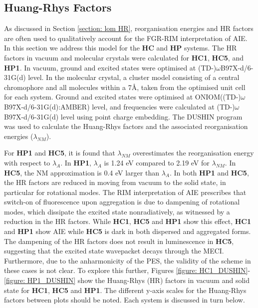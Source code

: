 \subsection{Huang-Rhys Factors}\label{section: HR}
As discussed in Section \ref{section: lom HR}, reorganisation energies and \acf{HR} factors are often used to qualitatively account for the \ac{FGR-RIM} interpretation of \ac{AIE}. In this section we address this model for the \textbf{HC} and \textbf{HP} systems.  The \ac{HR} factors in vacuum and molecular crystals were calculated for \textbf{HC1}, \textbf{HC5}, and \textbf{HP1}. In vacuum, ground and excited states were optimised at (TD-)$\omega$B97X-d/6-31G(d) level. In the molecular crystal, a cluster model consisting of a central chromophore and all molecules within a 7\AA{}, taken from the optimised unit cell for each system. Ground and excited states were optimised at ONIOM((TD-)$\omega$B97X-d/6-31G(d):AMBER) level, and frequencies were calculated at (TD-)$\omega$B97X-d/6-31G(d) level using point charge embedding. The DUSHIN program was used to calculate the Huang-Rhys factors and the associated reorganisation energies ($\lambda_{NM}$).\cite{Reimers2001}

For \textbf{HP1} and \textbf{HC5}, it is found that $\lambda_{NM}$ overestimates the reorganisation energy with respect to $\lambda_{A}$. In \textbf{HP1},  $\lambda_{A}$ is 1.24 eV compared to 2.19 eV for $\lambda_{NM}$. In \textbf{HC5}, the NM approximation is 0.4 eV larger than $\lambda_{A}$. In both \textbf{HP1} and \textbf{HC5}, the HR factors are reduced in moving from vacuum to the solid state, in particular for rotational modes. The RIM interpretation of AIE prescribes that switch-on of fluorescence upon aggregation is due to dampening of rotational modes, which dissipate the excited state nonradiatively, as witnessed by a reduction in the HR factors. While \textbf{HC1}, \textbf{HC5} and \textbf{HP1} show this effect, \textbf{HC1} and \textbf{HP1} show AIE while \textbf{HC5} is dark in both dispersed and aggregated forms. The dampening of the HR factors does not result in luminescence in \textbf{HC5}, suggesting that the excited state wavepacket decays through the MECI.\cite{Dommett2017} Furthermore, due to the anharmonicity of the PES, the validity of the scheme in these cases is not clear. To explore this further, Figures \ref{figure: HC1_DUSHIN}-\ref{figure: HP1_DUSHIN} show the Huang-Rhys (HR) factors in vacuum and solid state for \textbf{HC1}, \textbf{HC5} and \textbf{HP1}. The different y-axis scales for the Huang-Rhys factors between plots should be noted. Each system is discussed in turn below.

